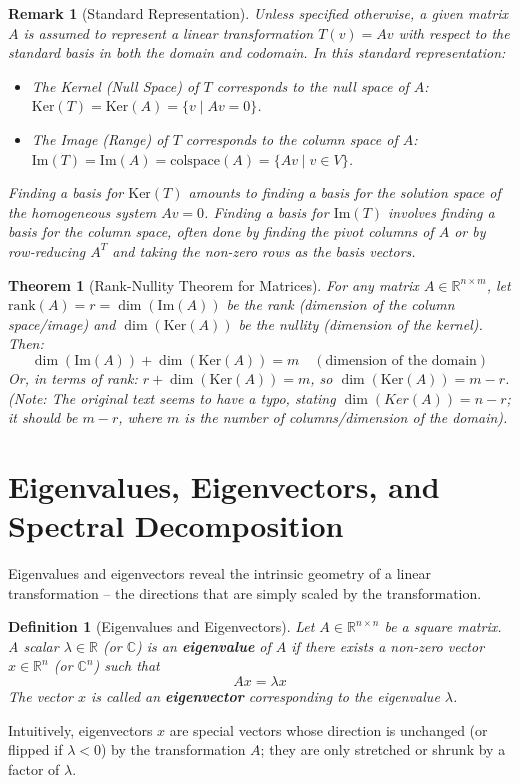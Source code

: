 \documentclass[11pt, a4paper]{article}
\theoremstyle{mydefinitionstyle}
\newtheorem{definition}{Definition}[section]
\newtheorem{remark}{Remark}[section]
\theoremstyle{mytheoremstyle}
\newtheorem{theorem}{Theorem}[section]
\newcommand{\R}{\mathbb{R}}
\newcommand{\colspace}{\text{colspace}}
\newcommand{\Ker}{\text{Ker}}
\newcommand{\im}{\text{Im}} %
\newcommand{\rank}{\text{rank}}
\begin{document}
\begin{remark}[Standard Representation] \label{rem:standard_rep}
    Unless specified otherwise, a given matrix $A$ is assumed to represent a linear transformation $T(v)=Av$ with respect to the standard basis in both the domain and codomain. In this standard representation:
    \begin{itemize}
        \item The Kernel (Null Space) of $T$ corresponds to the null space of $A$: $\Ker(T) = \Ker(A) = \{ v \mid Av = 0 \}$.
        \item The Image (Range) of $T$ corresponds to the column space of $A$: $\im(T) = \im(A) = \colspace(A) = \{ Av \mid v \in V \}$.
    \end{itemize}
    Finding a basis for $\Ker(T)$ amounts to finding a basis for the solution space of the homogeneous system $Av=0$. Finding a basis for $\im(T)$ involves finding a basis for the column space, often done by finding the pivot columns of $A$ or by row-reducing $A^T$ and taking the non-zero rows as the basis vectors.
\end{remark}

\begin{theorem}[Rank-Nullity Theorem for Matrices] \label{thm:rank_nullity}
    For any matrix $A \in \R^{n \times m}$, let $\rank(A) = r = \dim(\im(A))$ be the rank (dimension of the column space/image) and $\dim(\Ker(A))$ be the nullity (dimension of the kernel). Then:
    \[ \dim(\im(A)) + \dim(\Ker(A)) = m \quad (\text{dimension of the domain}) \]
    Or, in terms of rank: $r + \dim(\Ker(A)) = m$, so $\dim(\Ker(A)) = m - r$. (Note: The original text seems to have a typo, stating $\dim(Ker(A))=n-r$; it should be $m-r$, where $m$ is the number of columns/dimension of the domain).
\end{theorem}

\section{Eigenvalues, Eigenvectors, and Spectral Decomposition}

Eigenvalues and eigenvectors reveal the intrinsic geometry of a linear transformation – the directions that are simply scaled by the transformation.

\begin{definition}[Eigenvalues and Eigenvectors] \label{def:eigen}
    Let $A \in \R^{n \times n}$ be a square matrix. A scalar $\lambda \in \R$ (or $\mathbb{C}$) is an \textbf{eigenvalue} of $A$ if there exists a non-zero vector $x \in \R^n$ (or $\mathbb{C}^n$) such that
    \[ Ax = \lambda x \]
    The vector $x$ is called an \textbf{eigenvector} corresponding to the eigenvalue $\lambda$.
\end{definition}
Intuitively, eigenvectors $x$ are special vectors whose direction is unchanged (or flipped if $\lambda < 0$) by the transformation $A$; they are only stretched or shrunk by a factor of $\lambda$.
\end{document}
